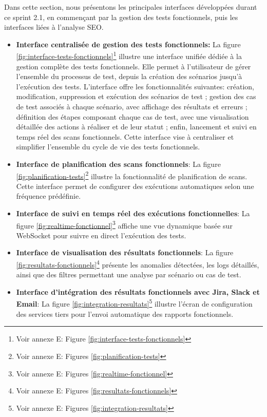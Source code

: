 Dans cette section, nous présentons les principales interfaces développées durant ce sprint 2.1, en commençant par la gestion des tests fonctionnels, puis les interfaces liées à l'analyse SEO.
\begin{itemize}[label=$\bullet$]
    \item \textbf{Interface centralisée de gestion des tests fonctionnels:} La figure \ref{fig:interface-tests-fonctionnels}\footnote{Voir annexe E: Figure \ref{fig:interface-tests-fonctionnels}} illustre une interface unifiée dédiée à la gestion complète des tests fonctionnels. Elle permet à l’utilisateur de gérer l’ensemble du processus de test, depuis la création des scénarios jusqu’à l’exécution des tests. L’interface offre les fonctionnalités suivantes: création, modification, suppression et exécution des scénarios de test ; gestion des cas de test associés à chaque scénario, avec affichage des résultats et erreurs ; définition des étapes composant chaque cas de test, avec une visualisation détaillée des actions à réaliser et de leur statut ; enfin, lancement et suivi en temps réel des scans fonctionnels. Cette interface vise à centraliser et simplifier l’ensemble du cycle de vie des tests fonctionnels.
    \item \textbf{Interface de planification des scans fonctionnels}:
    La figure \ref{fig:planification-tests}\footnote{Voir annexe E: Figures \ref{fig:planification-tests}} illustre la fonctionnalité de planification de scans. Cette interface permet de configurer des exécutions automatiques selon une fréquence prédéfinie.
    
    \item \textbf{Interface de suivi en temps réel des exécutions fonctionnelles}:
    La figure \ref{fig:realtime-fonctionnel}\footnote{Voir annexe E: Figures \ref{fig:realtime-fonctionnel}} affiche une vue dynamique basée sur WebSocket pour suivre en direct l'exécution des tests.
    
    \item \textbf{Interface de visualisation des résultats fonctionnels}:
    La figure \ref{fig:resultats-fonctionnels}\footnote{Voir annexe E: Figures \ref{fig:resultats-fonctionnels}} présente les anomalies détectées, les logs détaillés, ainsi que des filtres permettant une analyse par scénario ou cas de test.
    
    \item \textbf{Interface d’intégration des résultats fonctionnels avec Jira, Slack et Email}:
    La figure \ref{fig:integration-resultats}\footnote{Voir annexe E: Figures \ref{fig:integration-resultats}} illustre l’écran de configuration des services tiers pour l’envoi automatique des rapports fonctionnels.
    

\end{itemize}
